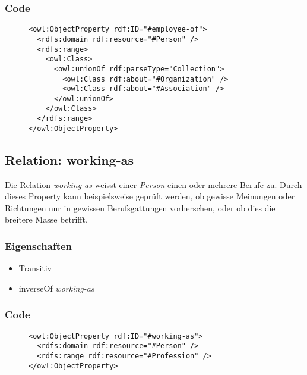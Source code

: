 \documentclass[
    11pt,
    latin1,
    a4paper,
    oneside
]{scrreprt}
\begin{document}
\subsubsection{Code} \label{sec:rel_employeeof_code}

\begin{figure}[h]
 \lstset{language=XML}
 \begin{lstlisting}[label=owl:employeeof,caption={Die Relation \emph{employee-of} gibt an, bei welcher \emph{Organization} oder \emph{Association} die Person angestellt ist}]
<owl:ObjectProperty rdf:ID="#employee-of">
  <rdfs:domain rdf:resource="#Person" />
  <rdfs:range>
    <owl:Class>
      <owl:unionOf rdf:parseType="Collection">
        <owl:Class rdf:about="#Organization" />
        <owl:Class rdf:about="#Association" />
      </owl:unionOf>
    </owl:Class>
  </rdfs:range>
</owl:ObjectProperty>
 \end{lstlisting}
\end{figure}


\subsection{Relation: working-as} \label{sec:rel_workingas}

Die Relation \emph{working-as} weisst einer \emph{Person} einen oder mehrere Berufe zu. Durch dieses Property kann beispielsweise gepr\"uft werden, ob gewisse Meinungen oder Richtungen nur in gewissen Berufsgattungen vorherschen, oder ob dies die breitere Masse betrifft.

\subsubsection{Eigenschaften} \label{sec:rel_workingas_settings}

\begin{itemize}
  \item Transitiv
  \item inverseOf \emph{working-as}
\end{itemize}

\subsubsection{Code} \label{sec:rel_workingas_code}

\begin{figure}[h]
 \lstset{language=XML}
 \begin{lstlisting}[label=owl:workingas,caption={Die Relation \emph{working-as} gibt an, welchen Beruf eine Person aus\"ubt}]
<owl:ObjectProperty rdf:ID="#working-as">
  <rdfs:domain rdf:resource="#Person" />
  <rdfs:range rdf:resource="#Profession" />
</owl:ObjectProperty>
 \end{lstlisting}
\end{figure}
\end{document}
